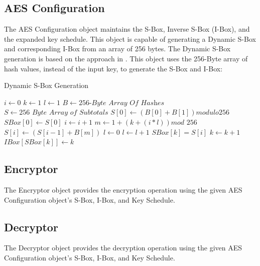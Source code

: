 \documentclass[journal]{IEEEtran}
\begin{document}
\subsection{AES Configuration}
The AES Configuration object maintains the S-Box, Inverse S-Box (I-Box), and the expanded key schedule. This object is capable of generating a Dynamic S-Box and corresponding I-Box from an array of 256 bytes. The Dynamic S-Box generation is based on the approach in \cite{AESKeySBox}. This object uses the 256-Byte array of hash values, instead of the input key, to generate the S-Box and I-Box:
\begin{algorithm}
	\caption{Dynamic S-Box Generation}\label{euclid}
	\begin{algorithmic}[1]
		\State $i \gets 0$
		\State $k \gets 1$
		\State $l \gets 1$
		\State $B \gets \textit{256-Byte Array Of Hashes}$
		\State $S \gets \textit{256 Byte Array of Subtotals}$
		\State $S[0] \gets (B[0]+B[1]) modulo 256$
		\State $SBox[0] \gets S[0]$
			\State $i \gets i + 1$
			\State $m \gets 1 + (k+(i*l)) \textit{mod 256}$
			\State $S[i] \gets (S[i-1]+B[m])$
			\State $l \gets 0$
					\State $l \gets l + 1$
				\EndIf	
			\EndFor
				\State $SBox[k]=S[i]$
				\State $k \gets k+1$
			\EndIf	
		\EndWhile
			\State $IBox[SBox[k]] \gets k$
		\EndFor
		\EndProcedure
	\end{algorithmic}
\end{algorithm} 

\subsection{Encryptor}
The Encryptor object provides the encryption operation using the given AES Configuration object's S-Box, I-Box, and Key Schedule.

\subsection{Decryptor}
The Decryptor object provides the decryption operation using the given AES Configuration object's S-Box, I-Box, and Key Schedule.
\end{document}
